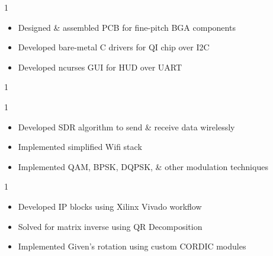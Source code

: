 \documentclass[10pt, letterpaper, ragged2e, withhyper]{AltaCV/altacv}
\def\RUWPTRX{0}		%
\def\RUSDR{1}		%
\def\RUXILINX{0}	%
\begin{document}


\makecvheader


\begin{paracol}{2}


\if\RUWPTRX1
\begin{itemize}
\item Designed \& assembled PCB for fine-pitch BGA components
\item Developed bare-metal C drivers for QI chip over I2C
\item Developed ncurses GUI for HUD over UART 
\end{itemize}
\fi

\if\RUSDR1

\if\RUWPTRX1
\divider
\fi

\begin{itemize}
\item Developed SDR algorithm to send \& receive data wirelessly
\item Implemented simplified Wifi stack
\item Implemented QAM, BPSK, DQPSK, \& other modulation techniques
\end{itemize}
\fi


\if\RUXILINX1

\divider

\begin{itemize}
\item Developed IP blocks using Xilinx Vivado workflow
\item Solved for matrix inverse using QR Decomposition
\item Implemented Given's rotation using custom CORDIC modules
\end{itemize}
\fi


\end{paracol}
\end{document}
